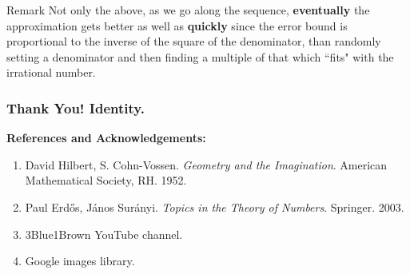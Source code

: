 \documentclass{beamer}
\begin{document}
    \begin{frame}
        \begin{alertblock}{Remark}
            Not only the above, as we go along the sequence, \textbf{eventually} the approximation gets better as well as \textbf{quickly} since the error bound is proportional to the inverse of the square of the denominator, than randomly setting a denominator and then finding a multiple of that which ``fits" with the irrational number.
        \end{alertblock}
    \end{frame}
    \begin{frame}
        \frametitle{Thank You! Identity.}
        \textbf{References and Acknowledgements: }
        \begin{enumerate}
            \item David Hilbert, S. Cohn-Vossen. \emph{Geometry and the Imagination}. American Mathematical Society, RH. 1952.
            \item Paul Erdős, János Surányi. \emph{Topics in the Theory of Numbers}. Springer. 2003.
            \item 3Blue1Brown YouTube channel.
            \item Google images library.
        \end{enumerate}
    \end{frame}
\end{document}
